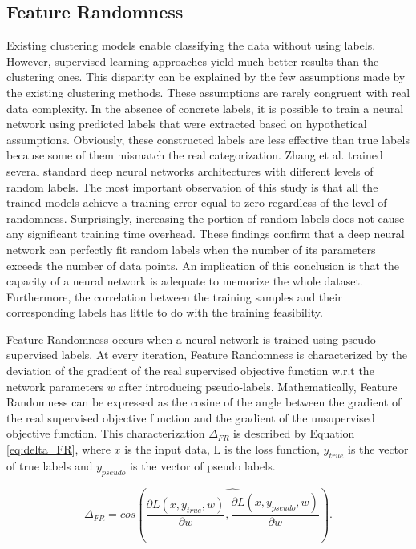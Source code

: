 \documentclass{article}
\begin{document}
\subsection{Feature Randomness}
Existing clustering models enable classifying the data without using labels. However, supervised learning approaches yield much better results than the clustering ones. This disparity can be explained by the few assumptions made by the existing clustering methods. These assumptions are rarely congruent with real data complexity. In the absence of concrete labels, it is possible to train a neural network using predicted labels that were extracted based on hypothetical assumptions. Obviously, these constructed labels are less effective than true labels because some of them mismatch the real categorization. Zhang et al. \cite{paper66} trained several standard deep neural networks architectures with different levels of random labels. The most important observation of this study is that all the trained models achieve a training error equal to zero regardless of the level of randomness. Surprisingly, increasing the portion of random labels does not cause any significant training time overhead. These findings confirm that a deep neural network can perfectly fit random labels when the number of its parameters exceeds the number of data points. An implication of this conclusion is that the capacity of a neural network is adequate to memorize the whole dataset. Furthermore, the correlation between the training samples and their corresponding labels has little to do with the training feasibility.

Feature Randomness occurs when a neural network is trained using pseudo-supervised labels.
At every iteration, Feature Randomness is characterized by the deviation of the gradient of the real supervised objective function w.r.t the network parameters $w$ after introducing pseudo-labels. Mathematically, Feature Randomness can be expressed as the cosine of the angle between the gradient of the real supervised objective function and the gradient of the unsupervised objective function. This characterization $\Delta_{FR}$ is described by Equation \ref{eq:delta_FR}, where $x$ is the input data, L is the loss function, $y_{true}$ is the vector of true labels and $y_{pseudo}$ is the vector of pseudo labels.

\begin{equation} \label{eq:delta_FR}
    \Delta_{FR}= cos(\widehat{\frac{\partial L(x, y_{true}, w)}{\partial w}, \frac{\partial L(x, y_{pseudo}, w)}{\partial w}}).
\end{equation}
\end{document}
